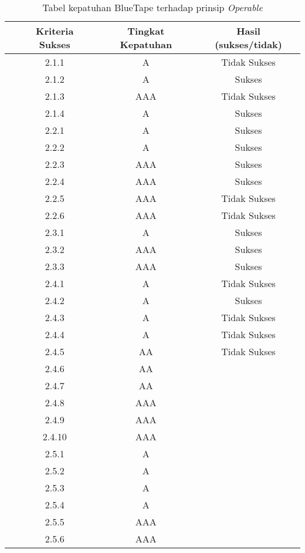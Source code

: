 \begin{table}[H]
\begin{tabular}{cccc}
        \bottomrule

    \end{tabular}
\end{table}
\begin{table}[H]
    \centering 
    \caption{Tabel kepatuhan BlueTape terhadap prinsip \textit{Operable}}
    \label{tab:kepatuhan_bluetape_operable}
    \begin{tabular}{cccc}
        \toprule
        & Kriteria Sukses & Tingkat Kepatuhan & Hasil (sukses/tidak)\\

        \midrule
        & 2.1.1 & A & Tidak Sukses \\
        & 2.1.2 & A & Sukses \\
        & 2.1.3 & AAA & Tidak Sukses \\
        & 2.1.4 & A & Sukses \\
        & 2.2.1 & A & Sukses \\
        & 2.2.2 & A & Sukses \\
        & 2.2.3 & AAA & Sukses \\
        & 2.2.4 & AAA & Sukses \\
        & 2.2.5 & AAA & Tidak Sukses \\
        & 2.2.6 & AAA & Tidak Sukses \\
        & 2.3.1 & A & Sukses \\
        & 2.3.2 & AAA & Sukses \\
        & 2.3.3 & AAA & Sukses \\
        & 2.4.1 & A & Tidak Sukses \\
        & 2.4.2 & A & Sukses \\
        & 2.4.3 & A & Tidak Sukses \\
        & 2.4.4 & A & Tidak Sukses \\
        & 2.4.5 & AA & Tidak Sukses \\
        & 2.4.6 & AA & \\
        & 2.4.7 & AA & \\
        & 2.4.8 & AAA & \\
        & 2.4.9 & AAA & \\
        & 2.4.10 & AAA & \\
        & 2.5.1 & A & \\
        & 2.5.2 & A & \\
        & 2.5.3 & A & \\
        & 2.5.4 & A & \\
        & 2.5.5 & AAA & \\
        & 2.5.6 & AAA & \\

        \bottomrule
    
    \end{tabular}
\end{table}

